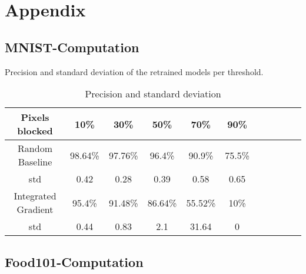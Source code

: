 \documentclass[
		a4paper,
		oneside,
		onecolumn,
		openany,
		parskip=half*,
		table,
		11pt,
		fleqn,
	]{scrbook}
\begin{document}

\begin{titlepage}

\end{titlepage}


\frontmatter



\begin{singlespace}
\tableofcontents
\listoffigures 
\end{singlespace}
	

\mainmatter




\backmatter

\printbibliography

\appendix

\chapter{Appendix}

\section{MNIST-Computation}




Precision and standard deviation of the retrained models per threshold.

\begin{table}[h]
	\centering
	\begin{tabular}{|c|c|c|c|c|c|c|c|c|c|c|}
		\hline
		
		Pixels blocked & 10\% & 30\% & 50\% & 70\% & 90\% \\
		\hline
		Random Baseline & 98.64\% & 97.76\% & 96.4\% & 90.9\% & 75.5\% \\
		std & 0.42 & 0.28 & 0.39 & 0.58 & 0.65  \\
		\hline
		Integrated Gradient& 95.4\% & 91.48\% & 86.64\% & 55.52\% & 10\%  \\
		std & 0.44 & 0.83 & 2.1 & 31.64 & 0  \\
		\hline
	\end{tabular} \newline
	
	\caption{Precision and standard deviation}
	\label{tab:sclass_precision_ig}
\end{table}


\section{Food101-Computation}
\end{document}
